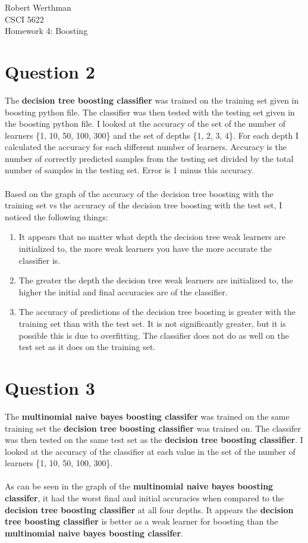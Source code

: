 \documentclass[10pt]{article}
\begin{document}
\noindent
Robert Werthman\\
CSCI 5622\\
Homework 4: Boosting\\

\section*{Question 2}
The \textbf{decision tree boosting classifier} was trained on the training set given in boosting python file.  The classifier was then tested with the testing 
set given in the boosting python file.  I looked at the accuracy of the set 
of the number of learners \{1, 10, 50, 100, 300\} and the set of depths \{1, 2, 3, 4\}.  
For each depth I calculated the accuracy for each different number 
of learners.  Accuracy is the number of correctly predicted samples from 
the testing set divided by the total number of samples in the testing set.  Error is 1 minus this accuracy.\\
\\
Based on the graph of the accuracy of the decision tree boosting with the training set vs the accuracy of the decision tree boosting with the test set, I noticed the following things:
\begin{enumerate}
  \item It appears that no matter what depth the decision tree 
  weak learners are initialized to, the more weak learners you have the more 
  accurate the classifier is.
  \item The greater the depth the decision tree weak learners are initialized to, the higher the initial and final accuracies are of the classifier.
  \item The accuracy of predictions of the decision tree boosting is greater with the training set than with the test set.  It is not significantly greater, but it is possible this is due to overfitting.  The classifier does not do as well on the test set as it does on the training set.
\end{enumerate}

\section*{Question 3}
The \textbf{multinomial naive bayes boosting classifer} was trained on 
the same training set the \textbf{decision tree boosting classifier} was trained on.  
The classifer was then tested on the same test set as the \textbf{decision tree boosting classifier}.  I looked at the accuracy of the classifier at each value in the set of the number of learners \{1, 10, 50, 100, 300\}.\\
\\
As can be seen in the graph of the \textbf{multinomial naive bayes boosting classifer}, it had the worst final and initial accuracies when compared to the \textbf{decision tree boosting classifier} at all four depths.  It appears the \textbf{decision tree boosting classifier} is better as a weak learner for boosting than the \textbf{multinomial naive bayes boosting classifer}.
\end{document}
